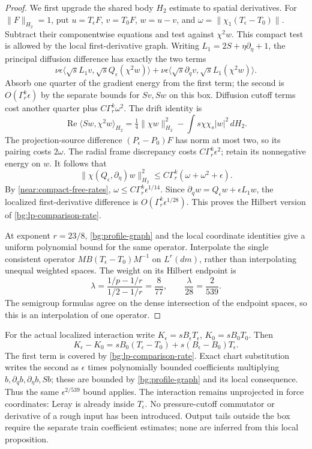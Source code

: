 \begin{proof}
We first upgrade the shared body \(H_2\) estimate to spatial
derivatives. For \(\|F\|_{H_2}=1\), put
\(u=T_\epsilon F\), \(v=T_0F\), \(w=u-v\), and
\(\omega=\|\chi_1(T_\epsilon-T_0)\|\).
Subtract their componentwise equations and test against \(\chi^2w\).
This compact test is allowed by the local first-derivative graph.
Writing \(L_1=2S+\eta\partial_\eta+1\), the principal diffusion
difference has exactly the two terms
\[
 \nu\epsilon\langle\sqrt{s}L_1v,
                    \sqrt{s}Q_\epsilon(\chi^2w)\rangle
 +\nu\epsilon\langle\sqrt{s}\partial_qv,
                    \sqrt{s}L_1(\chi^2w)\rangle.
\]
Absorb one quarter of the gradient energy from the first term;
the second is \(O(\Gamma_r^k\epsilon)\) by the separate bounds for
\(Sv,Sw\) on this box. Diffusion cutoff terms cost another quarter
plus \(C\Gamma_r^k\omega^2\). The drift identity is
\[
 \operatorname{Re}\langle Sw,\chi^2w\rangle_{H_2}
 =\tfrac14\|\chi w\|_{H_2}^2
          -\int s\chi\chi_s|w|^2\,dH_2.
\]
The projection-source difference \((P_\epsilon-P_0)F\) has norm
at most two, so its pairing costs \(2\omega\). The radial frame
discrepancy costs \(C\Gamma_r^k\epsilon^2\); retain its nonnegative
energy on \(w\). It follows that
\[
 \|\chi(Q_\epsilon,\partial_\eta)w\|_{H_2}^2
 \le C\Gamma_r^k(\omega+\omega^2+\epsilon).
\]
By \eqref{near:compact-free-rates}, \(\omega\le
C\Gamma_r^k\epsilon^{1/14}\). Since
\(\partial_qw=Q_\epsilon w+\epsilon L_1w\), the localized
first-derivative difference is \(O(\Gamma_r^k\epsilon^{1/28})\).
This proves the Hilbert version of \eqref{bg:lp-comparison-rate}.

At exponent \(r=23/8\), \eqref{bg:profile-graph} and the local
coordinate identities give a uniform polynomial bound for the same
operator. Interpolate the single consistent operator
\(MB(T_\epsilon-T_0)M^{-1}\) on \(L^r(dm)\), rather than
interpolating unequal weighted spaces. The weight on its Hilbert
endpoint is
\[
 \lambda=\frac{1/p-1/r}{1/2-1/r}=\frac8{77},\qquad
 \frac{\lambda}{28}=\frac2{539}.
\]
The semigroup formulas agree on the dense intersection of the endpoint
spaces, so this is an interpolation of one operator.

\end{proof}

For the actual localized interaction write
\(K_\epsilon=sB_\epsilon T_\epsilon\), \(K_0=sB_0T_0\).
Then
\[
 K_\epsilon-K_0=sB_0(T_\epsilon-T_0)
                       +s(B_\epsilon-B_0)T_\epsilon.
\]
The first term is covered by \eqref{bg:lp-comparison-rate}. Exact
chart substitution writes the second as \(\epsilon\) times
polynomially bounded coefficients multiplying
\(b,\partial_qb,\partial_\eta b,Sb\); these are bounded by
\eqref{bg:profile-graph} and its local consequence. Thus the same
\(\epsilon^{2/539}\) bound applies. The interaction remains
unprojected in force coordinates: Leray is already inside \(T_\epsilon\).
No pressure-cutoff commutator or derivative of a rough input has been
introduced. Output tails outside the box require the separate train
coefficient estimates; none are inferred from this local proposition.
